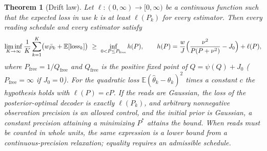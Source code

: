 \documentclass[12pt]{article}
\newtheorem{theorem}{Theorem}
\theoremstyle{definition}
\newcommand{\E}{\mathbb E}
\begin{document}
\begin{theorem}[Drift law]
\label{thm:driftlaw}
Let $\ell:(0,\infty)\to[0,\infty)$ be a continuous function such that the expected loss in use $k$ is at least $\ell(P_k)$ for every estimator. Then every reading schedule and every estimator satisfy
\begin{equation}
\label{eq:driftlaw}
\liminf_{K\to\infty}\frac1K\sum_{k=1}^K\bigl(w\bar\rho_k+\E[\mathrm{loss}_k]\bigr)\ \ge\ \inf_{0<P\le P_{\mathrm{free}}}h(P),\qquad
h(P)=\frac wJ\Bigl(\frac{\nu^2}{P(P+\nu^2)}-J_0\Bigr)+\ell(P),
\end{equation}
where $P_{\mathrm{free}}=1/Q_{\mathrm{free}}$ and $Q_{\mathrm{free}}$ is the positive fixed point of $Q=\psi(Q)+J_0$ ($P_{\mathrm{free}}=\infty$ if $J_0=0$). For the quadratic loss $\E(\hat\theta_k-\theta_k)^2$ times a constant $c$ the hypothesis holds with $\ell(P)=cP$. If the reads are Gaussian, the loss of the posterior-optimal decoder is
exactly $\ell(P_k)$, and arbitrary nonnegative observation precision is an
allowed control, and the initial prior is Gaussian, a constant precision attaining a minimizing $P^*$ attains
the bound. When reads must be counted in whole units, the same expression
is a lower bound from a continuous-precision relaxation; equality requires
an admissible schedule.
\end{theorem}
\end{document}
